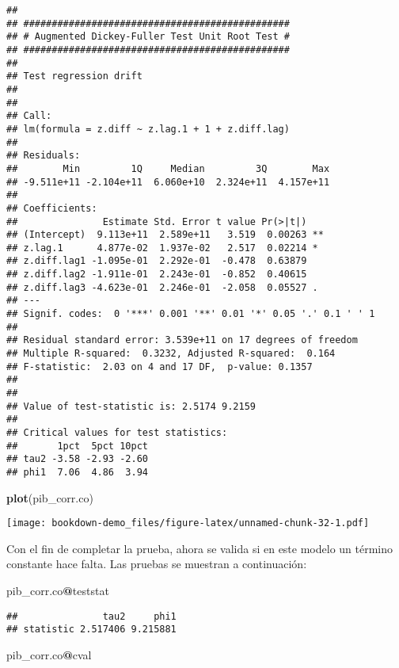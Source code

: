 \documentclass[]{book}
\newenvironment{Shaded}{\begin{snugshade}}{\end{snugshade}}
\newcommand{\KeywordTok}[1]{\textcolor[rgb]{0.13,0.29,0.53}{\textbf{#1}}}
\newcommand{\OperatorTok}[1]{\textcolor[rgb]{0.81,0.36,0.00}{\textbf{#1}}}
\newcommand{\NormalTok}[1]{#1}
\theoremstyle{definition}
\theoremstyle{definition}
\theoremstyle{definition}
\theoremstyle{remark}
\begin{document}
\begin{verbatim}
## 
## ############################################### 
## # Augmented Dickey-Fuller Test Unit Root Test # 
## ############################################### 
## 
## Test regression drift 
## 
## 
## Call:
## lm(formula = z.diff ~ z.lag.1 + 1 + z.diff.lag)
## 
## Residuals:
##        Min         1Q     Median         3Q        Max 
## -9.511e+11 -2.104e+11  6.060e+10  2.324e+11  4.157e+11 
## 
## Coefficients:
##               Estimate Std. Error t value Pr(>|t|)   
## (Intercept)  9.113e+11  2.589e+11   3.519  0.00263 **
## z.lag.1      4.877e-02  1.937e-02   2.517  0.02214 * 
## z.diff.lag1 -1.095e-01  2.292e-01  -0.478  0.63879   
## z.diff.lag2 -1.911e-01  2.243e-01  -0.852  0.40615   
## z.diff.lag3 -4.623e-01  2.246e-01  -2.058  0.05527 . 
## ---
## Signif. codes:  0 '***' 0.001 '**' 0.01 '*' 0.05 '.' 0.1 ' ' 1
## 
## Residual standard error: 3.539e+11 on 17 degrees of freedom
## Multiple R-squared:  0.3232, Adjusted R-squared:  0.164 
## F-statistic:  2.03 on 4 and 17 DF,  p-value: 0.1357
## 
## 
## Value of test-statistic is: 2.5174 9.2159 
## 
## Critical values for test statistics: 
##       1pct  5pct 10pct
## tau2 -3.58 -2.93 -2.60
## phi1  7.06  4.86  3.94
\end{verbatim}

\begin{Shaded}
\begin{Highlighting}[]
\KeywordTok{plot}\NormalTok{(pib_corr.co)}
\end{Highlighting}
\end{Shaded}

\texttt{[image: bookdown-demo\_files/figure-latex/unnamed-chunk-32-1.pdf]}

Con el fin de completar la prueba, ahora se valida si en este modelo un
término constante hace falta. Las pruebas se muestran a continuación:

\begin{Shaded}
\begin{Highlighting}[]
\NormalTok{pib_corr.co}\OperatorTok{@}\NormalTok{teststat}
\end{Highlighting}
\end{Shaded}

\begin{verbatim}
##               tau2     phi1
## statistic 2.517406 9.215881
\end{verbatim}

\begin{Shaded}
\begin{Highlighting}[]
\NormalTok{pib_corr.co}\OperatorTok{@}\NormalTok{cval}
\end{Highlighting}
\end{Shaded}
\end{document}
